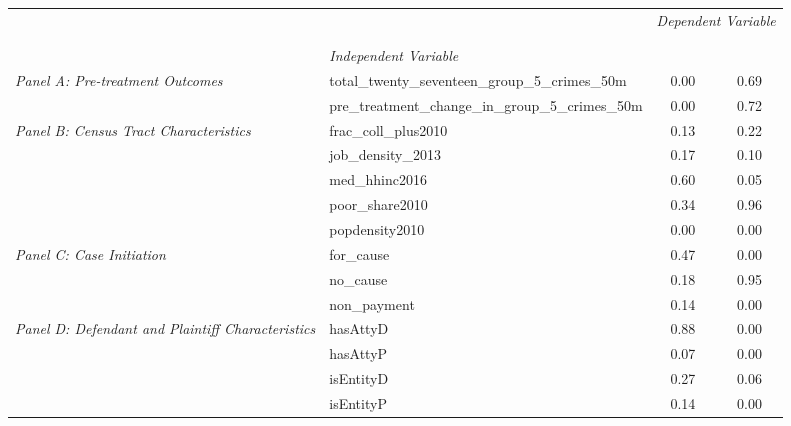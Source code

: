 \begin{tabular}{llcc}
\toprule
 &  & \multicolumn{2}{c}{\textit{Dependent Variable}} \\
\cline{3-4}
\\
 &  &  &  \\
 & \emph{Independent Variable} &  &  \\
\midrule
\multirow[c]{2}{3cm}{\textit{Panel A: Pre-treatment Outcomes}} & total_twenty_seventeen_group_5_crimes_50m & 0.00 & 0.69 \\
 & pre_treatment_change_in_group_5_crimes_50m & 0.00 & 0.72 \\
\cline{1-4}
\multirow[c]{5}{3cm}{\textit{Panel B: Census Tract Characteristics}} & frac_coll_plus2010 & 0.13 & 0.22 \\
 & job_density_2013 & 0.17 & 0.10 \\
 & med_hhinc2016 & 0.60 & 0.05 \\
 & poor_share2010 & 0.34 & 0.96 \\
 & popdensity2010 & 0.00 & 0.00 \\
\cline{1-4}
\multirow[c]{3}{3cm}{\textit{Panel C: Case Initiation}} & for_cause & 0.47 & 0.00 \\
 & no_cause & 0.18 & 0.95 \\
 & non_payment & 0.14 & 0.00 \\
\cline{1-4}
\multirow[c]{4}{3cm}{\textit{Panel D: Defendant and Plaintiff Characteristics}} & hasAttyD & 0.88 & 0.00 \\
 & hasAttyP & 0.07 & 0.00 \\
 & isEntityD & 0.27 & 0.06 \\
 & isEntityP & 0.14 & 0.00 \\
\cline{1-4}
\bottomrule
\end{tabular}
